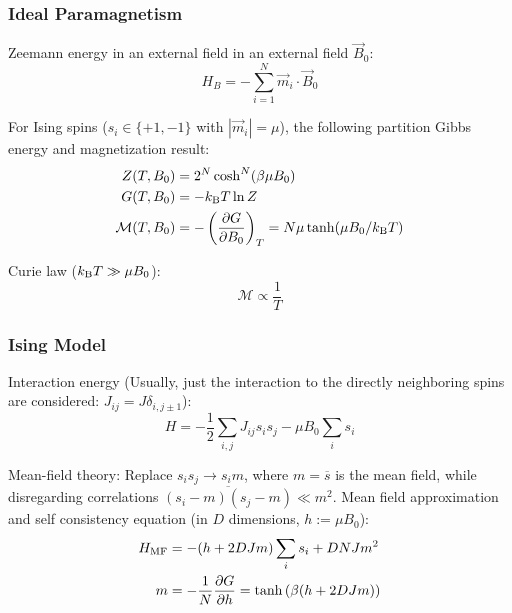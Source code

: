 		\subsubsection{Ideal Paramagnetism}
			\noindent
			Zeemann energy in an external field in an external field $\vec{B}_0$:
			\begin{equation}
				H_B = -\sum_{i=1}^N \vec{m}_i \cdot \vec{B}_0
			\end{equation}

			\noindent
			For Ising spins ($s_i\in\lbrace +1, -1\rbrace$ with $|\vec{m}_i| = \mu$), the following partition Gibbs energy and magnetization result:
			\begin{equation}
				\begin{aligned}
					Z(T,B_0) &= 2^N \cosh^N (\beta\mu B_0) \\
					G(T,B_0) &= -k_{\text{B}} T \ln Z \\
					\mathcal{M}(T,B_0) &= -\left(\pdv{G}{B_0}\right)_T = N\mu \tanh(\mu B_0 /k_{\text{B}} T)
				\end{aligned}
			\end{equation}

			\noindent
			Curie law ($k_{\text{B}} T \gg \mu B_0$):
			\begin{equation}
				\mathcal{M} \propto \frac{1}{T}
			\end{equation}

		\subsubsection{Ising Model}
			\noindent
			Interaction energy (Usually, just the interaction to the directly neighboring spins are considered: $J_{ij} = J \delta_{i,j\pm 1}$):
			\begin{equation}
				H = -\frac{1}{2}\sum_{i,j} J_{ij} s_i s_j -\mu B_0 \sum_i s_i
			\end{equation}

			\noindent
			Mean-field theory: \newline
			Replace $s_i s_j \rightarrow s_i m$, where $m = \overline{s}$ is the mean field, while disregarding correlations $\overline{(s_i-m)(s_j-m)}\ll m^2$. \nl
			Mean field approximation and self consistency equation (in $D$ dimensions, $h:=\mu B_0$):
			\begin{equation}
				\begin{aligned}
					H_\text{MF} &= -(h + 2 D J m) \sum_i s_i + D N J m^2 \\
					m &= -\frac{1}{N}\pdv{G}{h} = \tanh\left({\beta(h + 2 D J m)}\right)
				\end{aligned}
			\end{equation}

